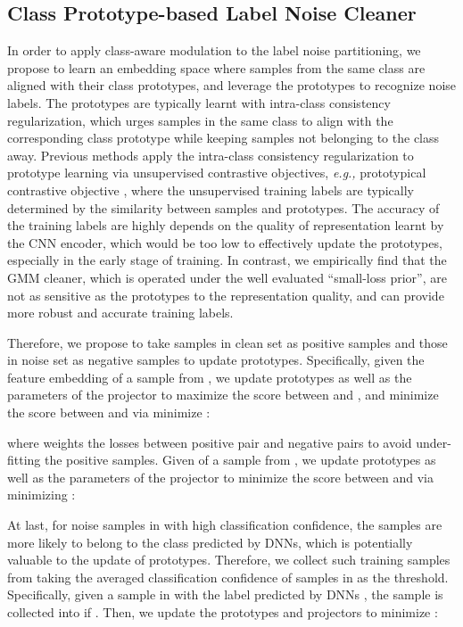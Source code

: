 \documentclass{article} \usepackage{iclr2023_conference,times}
\begin{document}
\subsection{Class Prototype-based Label Noise Cleaner}
In order to apply class-aware modulation to the label noise partitioning, we propose to learn an embedding space where samples from the same class are aligned with their class prototypes, and leverage the prototypes to recognize noise labels. The prototypes are typically learnt with intra-class consistency regularization, which urges samples in the same class to align with the corresponding class prototype while keeping samples not belonging to the class away. Previous methods \citep{wang2022pico,li2020mopro} apply the intra-class consistency regularization to prototype learning via  unsupervised contrastive objectives, \emph{e.g.,} prototypical contrastive objective \citep{li2020prototypical}, where the unsupervised training labels are typically determined by the similarity between samples and prototypes. The 
accuracy of the training labels are highly depends on the quality of representation learnt by the CNN encoder, which would be too low to effectively update the prototypes, especially in the early stage of training. In contrast, we empirically find that the GMM cleaner, which is operated under the well evaluated ``small-loss prior'', are not as sensitive as the prototypes to the representation quality, and can provide more robust and accurate training labels. 

Therefore, we propose to take samples in clean set  as positive samples and those in noise set  as negative samples to update prototypes. Specifically, given the feature embedding  of a sample  from , we update prototypes  as well as the parameters of the projector to maximize the score  between  and , and minimize the score between  and  via minimize : 

where  weights the losses between positive pair and negative pairs to avoid under-fitting the positive samples. Given  of a sample  from , we update prototypes  as well as the parameters of the projector to minimize the score  between  and  via minimizing :

At last, for noise samples in  with high classification confidence, the samples are more likely to belong to the class predicted by DNNs, which is potentially valuable to the update of prototypes. Therefore, we collect such training samples  from  taking the averaged classification confidence of samples in  as the threshold. Specifically, given a sample in  with the label predicted by DNNs , the sample is collected into  if   . Then, we update the prototypes and projectors to minimize :
\end{document}
